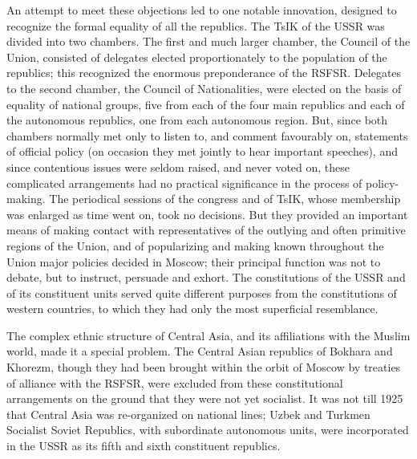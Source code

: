 An attempt to meet these objections led to one notable innovation, designed to recognize the formal equality of all the republics. The TsIK of the USSR was divided into two chambers. The first and much larger chamber, the Council of the Union, consisted of delegates elected proportionately to the population of the republics; this recognized the enormous preponderance of the RSFSR. Delegates to the second chamber, the Council of Nationalities, were elected on the basis of equality of national groups, five from each of the four main republics and each of the autonomous republics, one from each autonomous region. But, since both chambers normally met only to listen to, and comment favourably on, statements of official policy (on occasion they met jointly to hear important speeches), and since contentious issues were seldom raised, and never voted on, these complicated arrangements had no practical significance in the process of policy-making. The periodical sessions of the congress and of TsIK, whose membership was enlarged as time went on, took no decisions. But they provided an important means of making contact with representatives of the outlying and often primitive regions of the Union, and of popularizing and making known throughout the Union major policies decided in Moscow; their principal function was not to debate, but to instruct, persuade and exhort. The constitutions of the USSR and of its constituent units served quite different purposes from the constitutions of western countries, to which they had only the most superficial resemblance. 

The complex ethnic structure of Central Asia, and its affiliations with the Muslim world, made it a special problem. The Central Asian republics of Bokhara and Khorezm, though they had been brought within the orbit of Moscow by treaties of alliance with the RSFSR, were excluded from these constitutional arrangements on the ground that they were not yet socialist. It was not till 1925 that Central Asia was re-organized on national lines; Uzbek and Turkmen Socialist Soviet Republics, with subordinate autonomous units, were incorporated in the USSR as its fifth and sixth constituent republics. 

